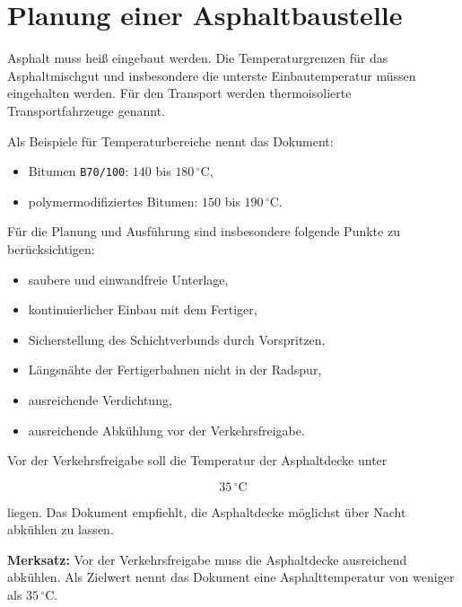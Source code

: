 \documentclass[
  12pt,
  a4paper,
  oneside
]{scrreprt}
\begin{document}
\section{Planung einer Asphaltbaustelle}

Asphalt muss heiß eingebaut werden. Die Temperaturgrenzen für das
Asphaltmischgut und insbesondere die unterste Einbautemperatur müssen
eingehalten werden. Für den Transport werden thermoisolierte
Transportfahrzeuge genannt.


Als Beispiele für Temperaturbereiche nennt das Dokument:

\begin{itemize}
  \item Bitumen \texttt{B70/100}: $140$ bis $180\,^\circ\mathrm{C}$,
  \item polymermodifiziertes Bitumen: $150$ bis $190\,^\circ\mathrm{C}$.
\end{itemize}



Für die Planung und Ausführung sind insbesondere folgende Punkte zu
berücksichtigen:

\begin{itemize}
  \item saubere und einwandfreie Unterlage,
  \item kontinuierlicher Einbau mit dem Fertiger,
  \item Sicherstellung des Schichtverbunds durch Vorspritzen,
  \item Längsnähte der Fertigerbahnen nicht in der Radspur,
  \item ausreichende Verdichtung,
  \item ausreichende Abkühlung vor der Verkehrsfreigabe.
\end{itemize}



Vor der Verkehrsfreigabe soll die Temperatur der Asphaltdecke unter

\begin{equation}
  35\,^\circ\mathrm{C}
\end{equation}

liegen. Das Dokument empfiehlt, die Asphaltdecke möglichst über Nacht
abkühlen zu lassen.


\begin{merksatzbox}
\textbf{Merksatz:}
Vor der Verkehrsfreigabe muss die Asphaltdecke ausreichend abkühlen.
Als Zielwert nennt das Dokument eine Asphalttemperatur von weniger als
$35\,^\circ\mathrm{C}$.

\end{merksatzbox}
\end{document}
